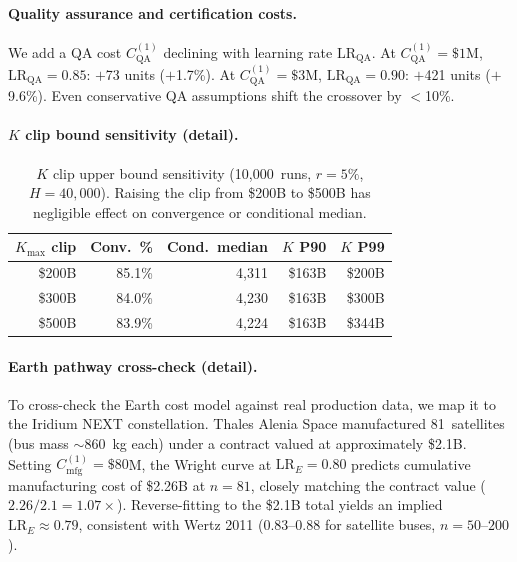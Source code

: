 \documentclass[preprint,12pt]{elsarticle}
\begin{document}
\paragraph{Quality assurance and certification costs.} We add a QA cost $C_{\mathrm{QA}}^{(1)}$ declining with learning rate $\mathrm{LR}_{\mathrm{QA}}$. At $C_{\mathrm{QA}}^{(1)} = \$1$M, $\mathrm{LR}_{\mathrm{QA}} = 0.85$: $+$73 units ($+$1.7\%). At $C_{\mathrm{QA}}^{(1)} = \$3$M, $\mathrm{LR}_{\mathrm{QA}} = 0.90$: $+$421 units ($+$9.6\%). Even conservative QA assumptions shift the crossover by $<$10\%.

\paragraph{$K$ clip bound sensitivity (detail).}

\begin{table}[htbp]
\centering
\caption{$K$ clip upper bound sensitivity (10{,}000~runs, $r = 5\%$, $H = 40{,}000$). Raising the clip from \$200B to \$500B has negligible effect on convergence or conditional median.}
\label{tab:k_clip}
\small
\begin{tabular}{@{}rrrrr@{}}
\toprule
$K_{\max}$ clip & Conv.\ \% & Cond.\ median & $K$ P90 & $K$ P99 \\
\midrule
\$200B & 85.1\% & 4{,}311 & \$163B & \$200B \\
\$300B & 84.0\% & 4{,}230 & \$163B & \$300B \\
\$500B & 83.9\% & 4{,}224 & \$163B & \$344B \\
\bottomrule
\end{tabular}
\end{table}

\paragraph{Earth pathway cross-check (detail).} To cross-check the Earth cost model against real production data, we map it to the Iridium NEXT constellation. Thales Alenia Space manufactured 81~satellites (bus mass $\sim$860~kg each) under a contract valued at approximately \$2.1B. Setting $C_{\mathrm{mfg}}^{(1)} = \$80$M, the Wright curve at $\mathrm{LR}_E = 0.80$ predicts cumulative manufacturing cost of \$2.26B at $n = 81$, closely matching the contract value ($2.26/2.1 = 1.07\times$). Reverse-fitting to the \$2.1B total yields an implied $\mathrm{LR}_E \approx 0.79$, consistent with Wertz 2011 \cite{wertz2011} (0.83--0.88 for satellite buses, $n = 50$--$200$).
\end{document}
